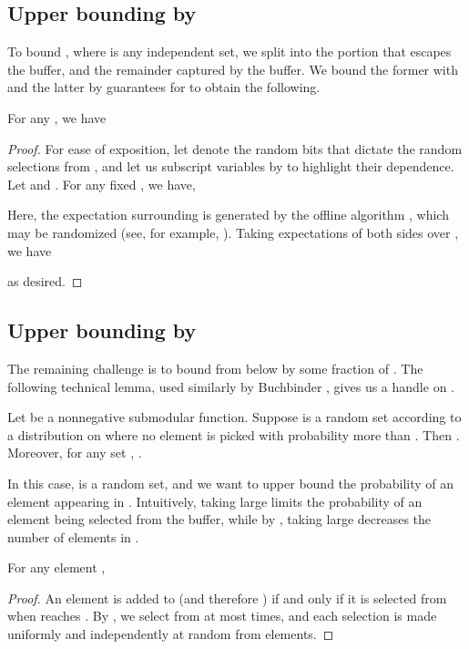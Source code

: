 \documentclass[oneside,letterpaper]{scrartcl} \usepackage{macros}
\begin{document}
\subsection{Upper bounding  by }

To bound , where  is any independent
set, we split  into the portion  that escapes the buffer, and the remainder
 captured by the buffer. We bound the
former with  and the latter by
guarantees for  to obtain the following.

\begin{lemma}
  For any , we have
  
\end{lemma}
\begin{proof}
  For ease of exposition, let  denote the random bits that dictate
  the random selections from , and let us subscript variables by
   to highlight their dependence.  Let  and . For any fixed ,
  we have,
  
  Here, the expectation surrounding  is generated by the
  offline algorithm , which may be randomized (see,
  for example, ).  Taking expectations of both sides
  over , we have
  
  as desired.
\end{proof}


\subsection{Upper bounding  by }

The remaining challenge is to bound  from below by
some fraction of . The following technical lemma, used similarly
by Buchbinder \etal, gives us a handle on .
\begin{lemma} Let  be a nonnegative
  submodular function. Suppose  is a random set according to a
  distribution  on  where no element  is picked with probability more than . Then
  . Moreover, for any set
  , .
\end{lemma}

In this case,  is a random set, and we want to upper bound
the probability of an element  appearing in
. Intuitively, taking  large limits the
probability of an element being selected from the buffer, while by
, taking  large decreases
the number of elements in .
\begin{lemma}
  For any element ,
  
\end{lemma}
\begin{proof}
  An element is added to  (and therefore ) if and only if
  it is selected from  when  reaches
  . By , we select
  from  at most  times, and each selection is
  made uniformly and independently at random from 
  elements.
\end{proof}
\end{document}
